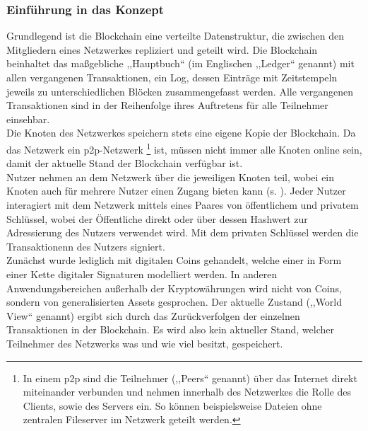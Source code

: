     \subsubsection{Einführung in das Konzept}
    \label{sec:sota_blockchain_introduction}
    Grundlegend ist die Blockchain eine verteilte Datenstruktur, die zwischen den Mitgliedern eines Netzwerkes repliziert und geteilt wird.
    Die Blockchain beinhaltet das maßgebliche ,,Hauptbuch`` (im Englischen ,,Ledger`` genannt) mit allen vergangenen Transaktionen, ein Log, dessen Einträge mit Zeitstempeln jeweils zu unterschiedlichen Blöcken zusammengefasst werden.\cite{Christidis2016}
    Alle vergangenen Transaktionen sind in der Reihenfolge ihres Auftretens für alle Teilnehmer einsehbar\cite{Nakamoto2008}.
    \medskip\\
    Die Knoten des Netzwerkes speichern stets eine eigene Kopie der Blockchain.
    Da das Netzwerk ein \gls{p2p}-Netzwerk \!\footnote{In einem \gls{p2p} sind die Teilnehmer (,,Peers`` genannt) über das Internet direkt miteinander verbunden und nehmen innerhalb des Netzwerkes die Rolle des Clients, sowie des Servers ein. So können beispielsweise Dateien ohne zentralen Fileserver im Netzwerk geteilt werden.} ist, müssen nicht immer alle Knoten online sein, damit der aktuelle Stand der Blockchain verfügbar ist.\cite{Christidis2016}
    \medskip\\
    Nutzer nehmen an dem Netzwerk über die jeweiligen Knoten teil, wobei ein Knoten auch für mehrere Nutzer einen Zugang bieten kann (s. ). 
    Jeder Nutzer interagiert mit dem Netzwerk mittels eines Paares von öffentlichem und privatem Schlüssel, wobei der Öffentliche direkt oder über dessen Hashwert zur Adressierung des Nutzers verwendet wird.
    Mit dem privaten Schlüssel werden die Transaktionenn des Nutzers signiert.\cite{Christidis2016}
    \medskip\\
    Zunächst wurde lediglich mit digitalen Coins gehandelt, welche einer in Form einer Kette digitaler Signaturen modelliert werden\cite{Nakamoto2008}.
    In anderen Anwendungsbereichen außerhalb der Kryptowährungen wird nicht von Coins, sondern von generalisierten Assets gesprochen.
    Der aktuelle Zustand (,,World View`` genannt) ergibt sich durch das Zurückverfolgen der einzelnen Transaktionen in der Blockchain. 
    Es wird also kein aktueller Stand, welcher Teilnehmer des Netzwerks was und wie viel besitzt, gespeichert.\cite{Christidis2016}
